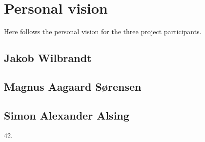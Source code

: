 
\chapter{Personal vision}
Here follows the personal vision for the three project participants.

\section{Jakob Wilbrandt}

\section{Magnus Aagaard Sørensen}

\section{Simon Alexander Alsing}

42.